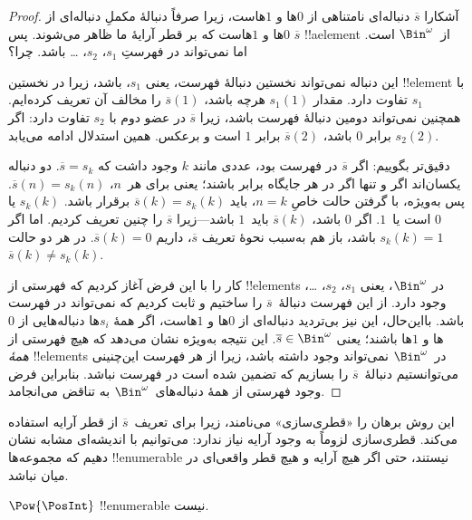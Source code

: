 \documentclass[../../../include/open-logic-section]{subfiles}
\begin{document}
\begin{proof}
آشکارا $\overline{s}$ دنباله‌ای نامتناهی از $0$ها و $1$هاست، زیرا
صرفاً دنبالهٔ مکملِ دنباله‌ای از $0$ها و $1$هاست که بر قطر آرایهٔ ما
ظاهر می‌شوند. پس $\overline{s}$ !!a{element} از~$\Bin^\omega$ است.
اما نمی‌تواند در فهرستِ $s_1$، $s_2$، \dots{} باشد. چرا؟

این دنباله نمی‌تواند نخستین دنبالهٔ فهرست، یعنی $s_1$، باشد، زیرا در
نخستین !!{element} با $s_1$ تفاوت دارد. مقدار $s_1(1)$ هرچه باشد،
$\overline{s}(1)$ را مخالف آن تعریف کرده‌ایم. همچنین نمی‌تواند دومین
دنبالهٔ فهرست باشد، زیرا $\overline{s}$ در عضو دوم با $s_2$ تفاوت
دارد: اگر $s_2(2)$ برابر $0$ باشد، $\overline{s}(2)$ برابر $1$ است و
برعکس. همین استدلال ادامه می‌یابد.

دقیق‌تر بگوییم: اگر $\overline{s}$ در فهرست بود، عددی مانند $k$ وجود
داشت که $\overline{s} = s_{k}$. دو دنباله یکسان‌اند اگر و تنها اگر در
هر جایگاه برابر باشند؛ یعنی برای هر~$n$، $\overline{s}(n) =
s_{k}(n)$. پس به‌ویژه، با گرفتن حالت خاصِ $n = k$، باید
$\overline{s}(k) = s_{k}(k)$ برقرار باشد. $s_k(k)$ یا $0$ است یا~$1$.
اگر $0$ باشد، $\overline{s}(k)$ باید~$1$ باشد---زیرا $\overline{s}$
را چنین تعریف کردیم. اما اگر $s_k(k) = 1$ باشد، باز هم به‌سبب نحوهٔ
تعریف $\overline{s}$، داریم $\overline{s}(k) = 0$. در هر دو حالت
$\overline{s}(k) \neq s_{k}(k)$.

کار را با این فرض آغاز کردیم که فهرستی از !!{element}s در
$\Bin^\omega$، یعنی $s_1$، $s_2$، \dots{}، وجود دارد. از این فهرست
دنبالهٔ~$\overline{s}$ را ساختیم و ثابت کردیم که نمی‌تواند در فهرست
باشد. بااین‌حال، این نیز بی‌تردید دنباله‌ای از $0$ها و $1$هاست، اگر
همهٔ $s_i$ها دنباله‌هایی از $0$ها و $1$ها باشند؛ یعنی $\overline{s} \in
\Bin^\omega$. این نتیجه به‌ویژه نشان می‌دهد که هیچ
فهرستی از \emph{همهٔ} !!{element}s در~$\Bin^\omega$ نمی‌تواند وجود داشته
باشد، زیرا از هر فهرست این‌چنینی می‌توانستیم دنبالهٔ~$\overline{s}$ را
بسازیم که تضمین شده است در فهرست نباشد. بنابراین فرض وجود فهرستی از
همهٔ دنباله‌های~$\Bin^\omega$ به تناقض می‌انجامد.
\end{proof}

\begin{explain}
این روش برهان را «قطری‌سازی» می‌نامند، زیرا برای تعریف~$\overline{s}$
از قطر آرایه استفاده می‌کند. قطری‌سازی لزوماً به وجود آرایه نیاز
ندارد: می‌توانیم با اندیشه‌ای مشابه نشان دهیم که مجموعه‌ها
!!{enumerable} نیستند، حتی اگر هیچ آرایه و هیچ قطر واقعی‌ای در میان
نباشد.
\end{explain}

\begin{thm}
$\Pow{\PosInt}$ !!{enumerable} نیست.
\end{thm}
\end{document}
